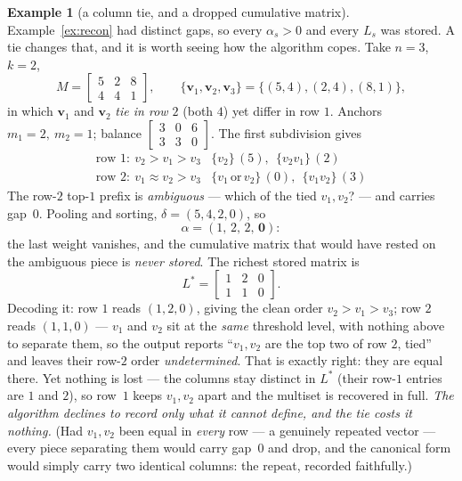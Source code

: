 \documentclass[11pt,a4paper]{article}
\theoremstyle{definition}
\newtheorem{example}[definition]{Example}
\theoremstyle{plain}
\begin{document}
\begin{example}[a column tie, and a dropped cumulative matrix]\label{ex:tie}
Example~\ref{ex:recon} had distinct gaps, so every $\alpha_s>0$ and every $L_s$
was stored. A tie changes that, and it is worth seeing how the algorithm copes.
Take $n=3$, $k=2$,
\[
   M=\begin{bmatrix}5&2&8\\[1pt]4&4&1\end{bmatrix},
   \qquad
   \{\mathbf v_1,\mathbf v_2,\mathbf v_3\}=\{(5,4),(2,4),(8,1)\},
\]
in which $\mathbf v_1$ and $\mathbf v_2$ \emph{tie in row $2$} (both $4$) yet
differ in row $1$. Anchors $m_1=2,\ m_2=1$; balance
$\left[\begin{smallmatrix}3&0&6\\3&3&0\end{smallmatrix}\right]$. The first
subdivision gives
\[
\renewcommand{\arraystretch}{1.2}
\begin{array}{c|l}
\text{row }1:\ v_2{>}v_1{>}v_3 & \{v_2\}\,(5),\ \ \{v_2v_1\}\,(2)\\
\text{row }2:\ v_1\approx v_2{>}v_3 & \{v_1\,\text{or}\,v_2\}\,(0),\ \ \{v_1v_2\}\,(3)
\end{array}
\]
The row-$2$ top-$1$ prefix is \emph{ambiguous} --- which of the tied
$v_1,v_2$? --- and carries gap~$0$. Pooling and sorting, $\delta=(5,4,2,0)$, so
\[
   \alpha=(1,\,2,\,2,\,\mathbf 0):
\]
the last weight vanishes, and the cumulative matrix that would have rested on the
ambiguous piece is \emph{never stored}. The richest stored matrix is
\[
   L^\ast=\begin{bmatrix}1&2&0\\[1pt]1&1&0\end{bmatrix}.
\]
Decoding it: row $1$ reads $(1,2,0)$, giving the clean order $v_2{>}v_1{>}v_3$;
row $2$ reads $(1,1,0)$ --- $v_1$ and $v_2$ sit at the \emph{same} threshold
level, with nothing above to separate them, so the output reports
``$v_1,v_2$ are the top two of row $2$, tied'' and leaves their row-$2$ order
\emph{undetermined}. That is exactly right: they are equal there. Yet nothing is
lost --- the columns stay distinct in $L^\ast$ (their row-$1$ entries are $1$ and
$2$), so row~$1$ keeps $v_1,v_2$ apart and the multiset is recovered in full.
\emph{The algorithm declines to record only what it cannot define, and the tie
costs it nothing.} (Had $v_1,v_2$ been equal in \emph{every} row --- a genuinely
repeated vector --- every piece separating them would carry gap~$0$ and drop,
and the canonical form would simply carry two identical columns: the repeat,
recorded faithfully.)
\end{example}
\end{document}
